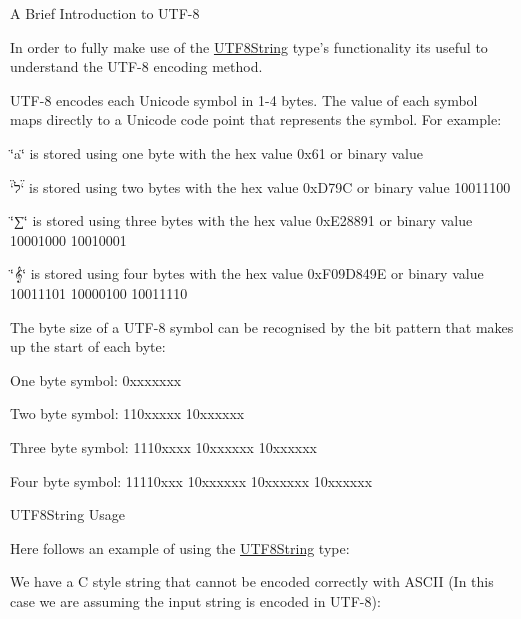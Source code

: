 \begin{DoxyParagraph}{A Brief Introduction to U\-T\-F-\/8}

\end{DoxyParagraph}
In order to fully make use of the \hyperlink{classchaos_1_1uni_1_1_u_t_f8_string}{U\-T\-F8\-String} type's functionality its useful to understand the U\-T\-F-\/8 encoding method.

U\-T\-F-\/8 encodes each Unicode symbol in 1-\/4 bytes. The value of each symbol maps directly to a Unicode code point that represents the symbol. For example\-:


\begin{DoxyItemize}
\item \char`\"{}a\char`\"{} is stored using one byte with the hex value 0x61 or binary value {}
\item \char`\"{}ל\char`\"{} is stored using two bytes with the hex value 0x\-D79\-C or binary value { 10011100}
\item \char`\"{}∑\char`\"{} is stored using three bytes with the hex value 0x\-E28891 or binary value { 10001000 10010001}
\item \char`\"{}𝄞\char`\"{} is stored using four bytes with the hex value 0x\-F09\-D849\-E or binary value { 10011101 10000100 10011110}
\end{DoxyItemize}

The byte size of a U\-T\-F-\/8 symbol can be recognised by the bit pattern that makes up the start of each byte\-:


\begin{DoxyItemize}
\item One byte symbol\-: {\ttfamily 0xxxxxxx}
\item Two byte symbol\-: {\ttfamily 110xxxxx 10xxxxxx}
\item Three byte symbol\-: {\ttfamily 1110xxxx 10xxxxxx 10xxxxxx}
\item Four byte symbol\-: {\ttfamily 11110xxx 10xxxxxx 10xxxxxx 10xxxxxx}
\end{DoxyItemize}

\begin{DoxyParagraph}{U\-T\-F8\-String Usage}

\end{DoxyParagraph}
Here follows an example of using the \hyperlink{classchaos_1_1uni_1_1_u_t_f8_string}{U\-T\-F8\-String} type\-:

We have a C style string that cannot be encoded correctly with A\-S\-C\-I\-I (In this case we are assuming the input string is encoded in U\-T\-F-\/8)\-:


